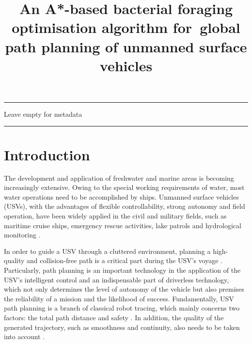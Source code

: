 \documentclass{PDS}%
\theoremstyle{definition}
\begin{document}
\articletype{}%

\title[\color{dscolor}A*-BASED BFO ALGORITHM FOR GLOBAL PATH PLANNING OF USVs]
{An A*-based bacterial foraging optimisation algorithm for~global path planning of unmanned surface vehicles}


\maketitle

\hrule{}
\vspace{35mm}
Leave empty for metadata
\vspace{35mm}
\hrule{}

\section{Introduction}


The development and application of freshwater and marine areas is becoming
increasingly extensive. Owing to the special working requirements of water, most water
operations need to be accomplished by ships. Unmanned surface vehicles (USVs), with the
advantages of flexible controllability, strong autonomy and field operation, have been
widely applied in the civil and military fields, such as maritime cruise ships, emergency rescue
activities, lake patrols and hydrological monitoring \citep{r6,r1,r4,r5,r3,r2}.

In order to guide a USV through a cluttered environment, planning a high-quality and
collision-free path is a critical part during the USV's voyage \citep{r7}. Particularly,
path planning is an important technology in the application of the USV's intelligent
control and an indispensable part of driverless technology, which not only determines the
level of autonomy of the vehicle but also premises the reliability of a mission and the
likelihood of success. Fundamentally, USV path planning is a branch of classical robot
tracing, which mainly concerns two factors: the total path distance and safety
\citep{r8}. In addition, the quality of the generated trajectory, such as smoothness and
continuity, also needs to be taken into account \citep{Smierzchalski1999}.
\end{document}
